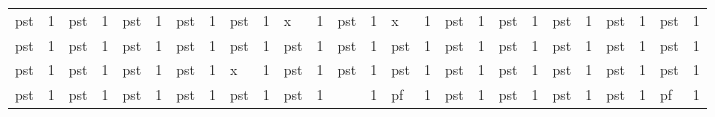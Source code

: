 \begin{table}[H]
\begin{center}
\begin{tabular}{llllllllllllllllllllllllll}
\rowcolor[HTML]{9AFF99} 
pst                       & 1 & pst                         & 1                         & pst                         & 1                         & pst                         & 1                         & pst                         & 1                         & \cellcolor[HTML]{C0C0C0}x   & 1                         & pst                         & 1                         & \cellcolor[HTML]{C0C0C0}x   & 1                         & pst        & 1        & pst         & 1         & pst          & 1         & pst         & 1         & pst                         & 1                         \\
\rowcolor[HTML]{9AFF99} 
pst                       & 1 & pst                         & 1                         & pst                         & 1                         & pst                         & 1                         & pst                         & 1                         & pst                         & 1                         & pst                         & 1                         & pst                         & 1                         & pst        & 1        & pst         & 1         & pst          & 1         & pst         & 1         & pst                         & 1                         \\
\rowcolor[HTML]{9AFF99} 
pst                       & 1 & pst                         & 1                         & pst                         & 1                         & pst                         & 1                         & \cellcolor[HTML]{C0C0C0}x   & 1                         & pst                         & 1                         & pst                         & 1                         & pst                         & 1                         & pst        & 1        & pst         & 1         & pst          & 1         & pst         & 1         & pst                         & 1                         \\
\rowcolor[HTML]{9AFF99} 
pst                       & 1 & pst                         & 1                         & pst                         & 1                         & pst                         & 1                         & pst                         & 1                         & pst                         & 1                         & \cellcolor[HTML]{C0C0C0}    & 1                         & \cellcolor[HTML]{FFCCC9}pf  & 1                         & pst        & 1        & pst         & 1         & pst          & 1         & pst         & 1         & \cellcolor[HTML]{FFCCC9}pf  & 1                         \\

\end{tabular}
\end{center}
\end{table}
